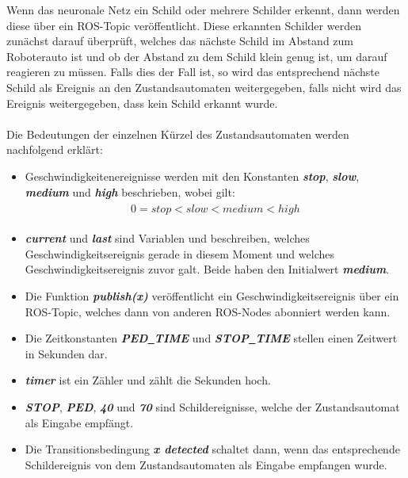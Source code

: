 Wenn das neuronale Netz ein Schild oder mehrere Schilder erkennt, dann werden diese \"uber ein ROS-Topic ver\"offentlicht. Diese erkannten Schilder werden zun\"achst darauf \"uberpr\"uft, welches das n\"achste Schild im Abstand zum Roboterauto ist und ob der Abstand zu dem Schild klein genug ist, um darauf reagieren zu m\"ussen. Falls dies der Fall ist, so wird das entsprechend n\"achste Schild als Ereignis an den Zustandsautomaten weitergegeben, falls nicht wird das Ereignis weitergegeben, dass kein Schild erkannt wurde.
\\\\Die Bedeutungen der einzelnen K\"urzel des Zustandsautomaten werden nachfolgend erkl\"art:
\begin{itemize}
	\item Geschwindigkeitenereignisse werden mit den Konstanten \textbf{\textit{stop}}, \textbf{\textit{slow}}, \textbf{\textit{medium}} und \textbf{\textit{high}} beschrieben, wobei gilt:
	\begin{align}
	\begin{split}
	\label{vel_vergleich}
	0 = stop < slow < medium < high
	\end{split}
	\end{align}
	
	\item \textbf{\textit{current}} und \textbf{\textit{last}} sind Variablen und beschreiben, welches Geschwindigkeitsereignis gerade in diesem Moment und welches Geschwindigkeitsereignis zuvor galt. Beide haben den Initialwert \textbf{\textit{medium}}.
	
	\item Die Funktion \textbf{\textit{publish(x)}} ver\"offentlicht ein Geschwindigkeitsereignis \"uber ein ROS-Topic, welches dann von anderen ROS-Nodes abonniert werden kann.
	
	\item Die Zeitkonstanten \textbf{\textit{PED\underline{\ }TIME}} und \textbf{\textit{STOP\underline{\ }TIME}} stellen einen Zeitwert in Sekunden dar.
	
	\item \textbf{\textit{timer}} ist ein Z\"ahler und z\"ahlt die Sekunden hoch.
	
	\item \textbf{\textit{STOP}}, \textbf{\textit{PED}}, \textbf{\textit{40}} und \textbf{\textit{70}} sind Schildereignisse, welche der Zustandsautomat als Eingabe empf\"angt. 
	
	\item Die Transitionsbedingung \textbf{\textit{x detected}} schaltet dann, wenn das entsprechende Schildereignis von dem Zustandsautomaten als Eingabe empfangen wurde.
	

\end{itemize}
